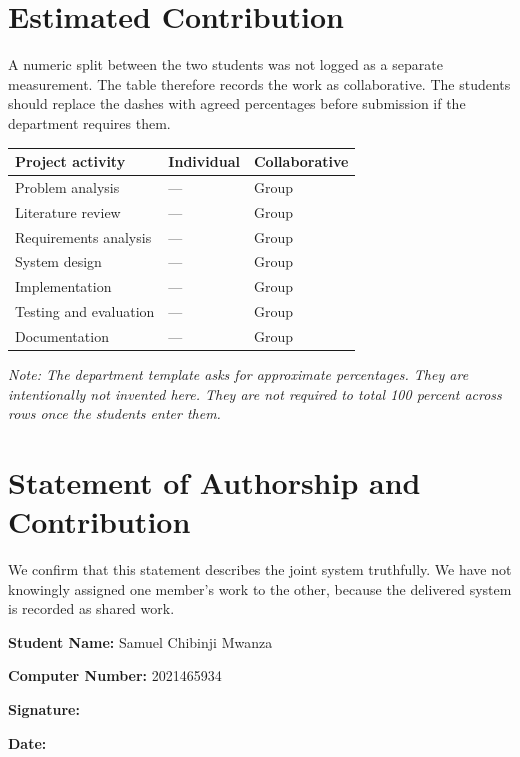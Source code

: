 \documentclass[12pt,a4paper]{report}
\begin{document}
\section{Estimated Contribution}
A numeric split between the two students was not logged as a separate measurement. The table therefore records the work as collaborative. The students should replace the dashes with agreed percentages before submission if the department requires them.

\begin{table}[H]
\centering
\begin{tabular}{p{}p{}p{}}
\toprule
\textbf{Project activity} & \textbf{Individual} & \textbf{Collaborative} \\
\midrule
Problem analysis & --- & Group \\
Literature review & --- & Group \\
Requirements analysis & --- & Group \\
System design & --- & Group \\
Implementation & --- & Group \\
Testing and evaluation & --- & Group \\
Documentation & --- & Group \\
\bottomrule
\end{tabular}
\end{table}

\noindent
\textit{Note: The department template asks for approximate percentages. They are intentionally not invented here. They are not required to total 100 percent across rows once the students enter them.}

\section{Statement of Authorship and Contribution}
We confirm that this statement describes the joint system truthfully. We have not knowingly assigned one member's work to the other, because the delivered system is recorded as shared work.

\vspace{1cm}
\noindent\textbf{Student Name:} Samuel Chibinji Mwanza

\vspace{0.5cm}
\noindent\textbf{Computer Number:} 2021465934

\vspace{0.5cm}
\noindent\textbf{Signature:} \hrulefill

\vspace{0.5cm}
\noindent\textbf{Date:} \hrulefill
\end{document}
